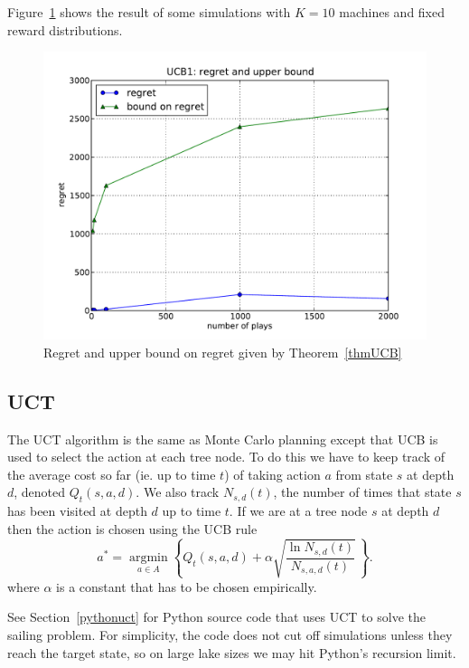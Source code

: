 \documentclass[10pt,amstags,fleqn]{article}
\theoremstyle{plain}
\theoremstyle{definition}
\theoremstyle{definition}
\begin{document}
Figure~\ref{ucbregret} shows the result of some simulations with $K =
10$ machines and fixed reward distributions.
\begin{figure}[htb]
\begin{center}
\includegraphics[width=.75\textwidth]{regret_and_bound.pdf}
\end{center}
\caption{Regret and upper bound on regret given by Theorem~\ref{thmUCB}}\label{ucbregret}
\end{figure}

\subsection{UCT}

The UCT algorithm is the same as Monte Carlo planning except that UCB is used to
select the action at each tree node. To do this we have to keep track of
the average cost so far (ie. up to time $t$)
of taking action $a$ from state $s$ at depth $d$,
denoted $Q_t(s,a,d)$. We also track $N_{s,d}(t)$, the number of times
that state $s$ has been visited at depth $d$ up to time $t$. If we are
at a tree node $s$ at depth $d$ then the action is chosen using
the UCB rule
\begin{equation}\label{eqnuct}
a^* = \underset{a \in A}{\operatorname{argmin}} 
 \left\{ Q_t(s,a,d) + \alpha \sqrt{\frac{\ln N_{s,d}(t)}{N_{s,a,d}(t)}} \, \right\}.
\end{equation}
where $\alpha$ is a constant that has to be chosen empirically.

See Section~\ref{pythonuct} for Python source code that uses UCT to
solve the sailing problem.  For simplicity, the code does not cut
off simulations unless they reach the target state, so on large lake
sizes we may hit Python's recursion limit.
\end{document}
